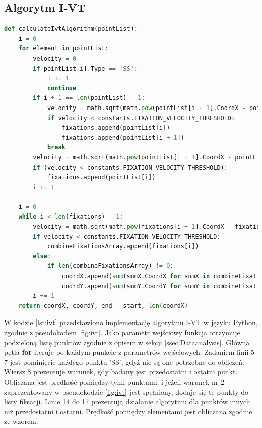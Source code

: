 \subsection{Algorytm I-VT}
\label{ssec:implementivt}
\begin{lstlisting}[language=Python, caption=Kod algorytmu I-VT, label={lst:ivt}]
def calculateIvtAlgorithm(pointList):
    i = 0
    for element in pointList:
        velocity = 0
        if pointList[i].Type == 'SS':
            i += 1
            continue
        if i + 1 == len(pointList) - 1:
            velocity = math.sqrt(math.pow(pointList[i + 1].CoordX - pointList[i].CoordX, 2) + math.pow(pointList[i + 1].CoordY - pointList[i].CoordY, 2))
            if velocity < constants.FIXATION_VELOCITY_THRESHOLD:
                fixations.append(pointList[i])
                fixations.append(pointList[i + 1])
            break
        velocity = math.sqrt(math.pow(pointList[i + 1].CoordX - pointList[i].CoordX, 2) + math.pow(pointList[i + 1].CoordY - pointList[i].CoordY, 2))
        if (velocity < constants.FIXATION_VELOCITY_THRESHOLD):
            fixations.append(pointList[i])
        i += 1
    
    i = 0
    while i < len(fixations) - 1:
        velocity = math.sqrt(math.pow(fixations[i + 1].CoordX - fixations[i].CoordX, 2) + math.pow(fixations[i + 1].CoordY - fixations[i].CoordY, 2))
        if velocity < constants.FIXATION_VELOCITY_THRESHOLD:
            combineFixationsArray.append(fixations[i])
        else:
            if len(combineFixationsArray) != 0:
                coordX.append(sum(sumX.CoordX for sumX in combineFixationsArray) / len(combineFixationsArray))
                coordY.append(sum(sumY.CoordY for sumY in combineFixationsArray) / len(combineFixationsArray))
        i += 1
    return coordX, coordY, end - start, len(coordX)
\end{lstlisting}
W kodzie \ref{lst:ivt} przedstawiono implementację algorytmu I-VT w języku Python, zgodnie z pseudokodem \ref{fig:ivt}. Jako parametr wejściowy funkcja otrzymuje podzieloną listę punktów zgodnie z opisem w sekcji \ref{ssec:Dataanalysis}. Główna pętla \textbf{for} iteruje po każdym punkcie z parametrów wejściowych. Zadaniem linii 5-7 jest pominięcie każdego punktu 'SS', gdyż nie są one potrzebne do obliczeń. Wiersz 8 prezentuje warunek, gdy badany jest przedostatni i ostatni punkt. Obliczana jest prędkość pomiędzy tymi punktami, i jeżeli warunek nr 2 zaprezentowany w pseudokodzie \ref{fig:ivt} jest spełniony, dodaje się te punkty do listy fiksacji. Linie 14 do 17 prezentują działanie algorytmu dla punktów innych niż przedostatni i ostatni. Prędkość pomiędzy elementami jest obliczana zgodnie ze wzorem:
